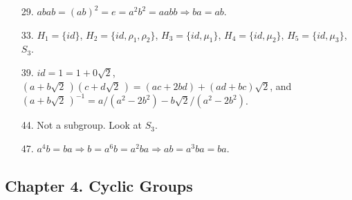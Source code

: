 {\begin{itemize}
\item[29.]
$abab = (ab)^2 = e = a^2 b^2 = aabb\Rightarrow  ba = ab$.
 
\item[33.]
$H_1 = \{ id \}$, $H_2 = \{ id, \rho_1, \rho_2  \}$, $H_3 = \{ id,
\mu_1 \}$, $H_4 = \{ id, \mu_2 \}$, $H_5 = \{ id, \mu_3 \}$, $S_3$.
 
\item[39.]
$id = 1 = 1 + 0 \sqrt{2}$, $(a + b \sqrt{2}\, )(c + d \sqrt{2}\, ) = 
(ac + 2bd) + (ad + bc)\sqrt{2}$, and $(a + b \sqrt{2}\, )^{-1} = a/(a^2
-2b^2) - b\sqrt{2}/(a^2 - 2 b^2)$.
 
\item[44.]
Not a subgroup. Look at $S_3$.
 
\item[47.]
$a^4b =ba \Rightarrow b = a^6 b = a^2 b a \Rightarrow ab = a^3 b a =
ba$. 
 
\end{itemize}
}
 
\subsection*{Chapter 4. Cyclic Groups}
 
